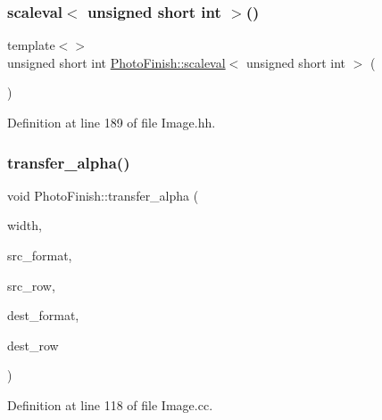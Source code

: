 \subsubsection{\texorpdfstring{scaleval$<$ unsigned short int $>$()}{scaleval< unsigned short int >()}}
{\footnotesize\ttfamily template$<$$>$ \\
unsigned short int \hyperlink{namespace_photo_finish_a1bfb8180736f3b2786f47361d7586f2c}{Photo\+Finish\+::scaleval}$<$ unsigned short int $>$ (\begin{DoxyParamCaption}\item[{void}]{ }\end{DoxyParamCaption})\hspace{0.3cm}{\ttfamily [inline]}}



Definition at line 189 of file Image.\+hh.

\mbox{\label{namespace_photo_finish_aeabb5e211b3ca0e80d736b002a73d534}} 
\subsubsection{\texorpdfstring{transfer\+\_\+alpha()}{transfer\_alpha()}}
{\footnotesize\ttfamily void Photo\+Finish\+::transfer\+\_\+alpha (\begin{DoxyParamCaption}\item[{unsigned int}]{width,  }\item[{\hyperlink{class_c_m_s_1_1_format}{C\+M\+S\+::\+Format}}]{src\+\_\+format,  }\item[{const unsigned char $\ast$}]{src\+\_\+row,  }\item[{\hyperlink{class_c_m_s_1_1_format}{C\+M\+S\+::\+Format}}]{dest\+\_\+format,  }\item[{const unsigned char $\ast$}]{dest\+\_\+row }\end{DoxyParamCaption})}



Definition at line 118 of file Image.\+cc.

\mbox{\label{namespace_photo_finish_a2e770f57d0b1dab1f2dc51c2fc7d8d55}} 
